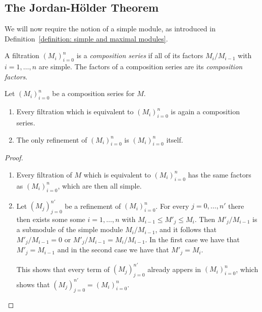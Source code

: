 \subsection{The Jordan-Hölder Theorem}


\begin{fluff}
  We will now require the notion of a simple module, as introduced in Definition~\ref{definition: simple and maximal modules}.
\end{fluff}


\begin{definition}
  \label{definition: composition series}
  A filtration $(M_i)_{i=0}^n$ is a \emph{composition series} if all of its factors $M_i/M_{i-1}$ with $i = 1, \dotsc, n$ are simple.
  The factors of a composition series are its \emph{composition factors}.
\end{definition}


\begin{lemma}
  \label{lemma: preparation for jordan hoelder}
  Let $(M_i)_{i=0}^n$ be a composition series for $M$.
  \begin{enumerate}
    \item
      Every filtration which is equivalent to $(M_i)_{i=0}^n$ is again a composition series.
    \item
      The only refinement of $(M_i)_{i=0}^n$ is $(M_i)_{i=0}^n$ itself.
  \end{enumerate}
\end{lemma}


\begin{proof}
  \leavevmode
  \begin{enumerate}
    \item
      Every filtration of $M$ which is equivalent to $(M_i)_{i=0}^n$ has the same factors as $(M_i)_{i=0}^n$, which are then all simple.
    \item
      Let $(M_j)_{j=0}^{n'}$ be a refinement of $(M_i)_{i=0}^n$.
      For every $j = 0, \dotsc, n'$ there then exists some some $i = 1, \dotsc, n$ with $M_{i-1} \leq M'_j \leq M_i$.
      Then $M'_j/M_{i-1}$ is a submodule of the simple module $M_i/M_{i-1}$, and it follows that $M'_j/M_{i-1} = 0$ or $M'_j/M_{i-1} = M_i/M_{i-1}$.
      In the first case we have that $M'_j = M_{i-1}$ and in the second case we have that $M'_j = M_i$.
      
      This shows that every term of $(M_j)_{j=0}^{n'}$ already appers in $(M_i)_{i=0}^n$, which shows that $(M_j)_{j=0}^{n'} = (M_i)_{i=0}^n$.
    \qedhere
  \end{enumerate}
\end{proof}


